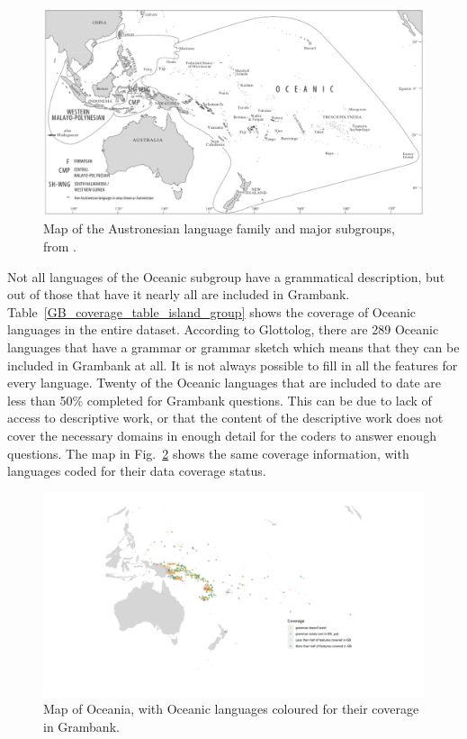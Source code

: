 \documentclass[a4paper,10pt]{article} %
\begin{document}
\begin{figure}[h]
\centering
\includegraphics[width=\textwidth]{illustrations/ross_pawley_osmond_protooceanic_vol5.png}
\caption{{Map of the Austronesian language family and major subgroups, from \citet[2]{protooceanicvol5}.}}
\label{Oceanic_map}
\end{figure} 

Not all languages of the Oceanic subgroup have a grammatical description, but out of those that have it nearly all are included in Grambank. Table~\ref{GB_coverage_table_island_group} shows the coverage of Oceanic languages in the entire dataset. According to Glottolog, there are 289 Oceanic languages that have a grammar or grammar sketch which means that they can be included in Grambank at all. It is not always possible to fill in all the features for every language. Twenty of the Oceanic languages that are included to date are less than 50\% completed for Grambank questions. This can be due to lack of access to descriptive work, or that the content of the descriptive work does not cover the necessary domains in enough detail for the coders to answer enough questions. The map in Fig.~\ref{GB_austro_coverage} shows the same coverage information, with languages coded for their data coverage status.

\newpage

\newpage

\begin{figure}
\centering
\includegraphics[width=\textwidth]{illustrations/plots_from_R/coverage_plots/maps/coverage_map_oceanic.png}
\caption{{Map of Oceania, with Oceanic languages coloured for their coverage in Grambank.}}
\label{GB_austro_coverage}
\end{figure} %
\end{document}

